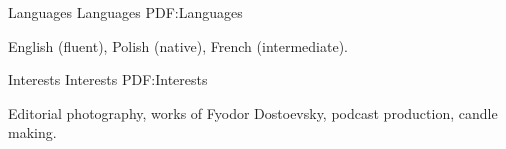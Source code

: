 \documentclass[letterpaper,MMMyyyy,nonstopmode]{simpleresumecv}
\begin{document}
\begin{Body}




\noindent\hrulefill
\Section
{Languages}
{Languages}
{PDF:Languages}

English (fluent), Polish (native), French (intermediate).


\Section
{Interests}
{Interests}
{PDF:Interests}

Editorial photography, works of Fyodor Dostoevsky, podcast production, candle making.



\end{Body}


\BigGap
\UseNoteFont%
\null\hfill%
\end{document}
